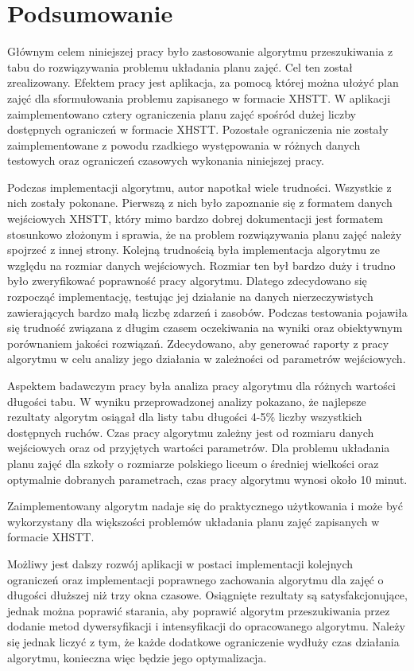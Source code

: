 \chapter{Podsumowanie}

Głównym celem niniejszej pracy było zastosowanie algorytmu przeszukiwania z tabu do rozwiązywania problemu układania planu zajęć. Cel ten został zrealizowany. Efektem pracy jest aplikacja, za pomocą której można ułożyć plan zajęć dla sformułowania problemu zapisanego w formacie XHSTT. W aplikacji zaimplementowano cztery ograniczenia planu zajęć spośród dużej liczby dostępnych ograniczeń w formacie XHSTT. Pozostałe ograniczenia nie zostały zaimplementowane z powodu rzadkiego występowania w różnych danych testowych oraz ograniczeń czasowych wykonania niniejszej pracy. 

Podczas implementacji algorytmu, autor napotkał wiele trudności. Wszystkie z nich zostały pokonane. Pierwszą z nich było zapoznanie się z formatem danych wejściowych XHSTT, który mimo bardzo dobrej dokumentacji jest formatem stosunkowo złożonym i sprawia, że na problem rozwiązywania planu zajęć należy spojrzeć z innej strony. Kolejną trudnością była implementacja algorytmu ze względu na rozmiar danych wejściowych. Rozmiar ten był bardzo duży i trudno było zweryfikować poprawność pracy algorytmu. Dlatego zdecydowano się rozpocząć implementację, testując jej działanie na danych nierzeczywistych zawierających bardzo małą liczbę zdarzeń i zasobów. Podczas testowania pojawiła się trudność związana z długim czasem oczekiwania na wyniki oraz obiektywnym porównaniem jakości rozwiązań. Zdecydowano, aby generować raporty z pracy algorytmu w celu analizy jego działania w zależności od parametrów wejściowych.

Aspektem badawczym pracy była analiza pracy algorytmu dla różnych wartości długości tabu. W wyniku przeprowadzonej analizy pokazano, że najlepsze rezultaty algorytm osiągał dla listy tabu długości 4-5\% liczby wszystkich dostępnych ruchów. Czas pracy algorytmu zależny jest od rozmiaru danych wejściowych oraz od przyjętych wartości parametrów. Dla problemu układania planu zajęć dla szkoły o rozmiarze polskiego liceum o średniej wielkości oraz optymalnie dobranych parametrach, czas pracy algorytmu wynosi około 10 minut.

Zaimplementowany algorytm nadaje się do praktycznego użytkowania i może być wykorzystany dla większości problemów układania planu zajęć zapisanych w formacie XHSTT.

Możliwy jest dalszy rozwój aplikacji w postaci implementacji kolejnych ograniczeń oraz implementacji poprawnego zachowania algorytmu dla zajęć o długości dłuższej niż trzy okna czasowe. Osiągnięte rezultaty są satysfakcjonujące, jednak można poprawić starania, aby poprawić algorytm przeszukiwania przez dodanie metod dywersyfikacji i intensyfikacji do opracowanego algorytmu. Należy się jednak liczyć z tym, że każde dodatkowe ograniczenie wydłuży czas działania algorytmu, konieczna więc będzie jego optymalizacja.

